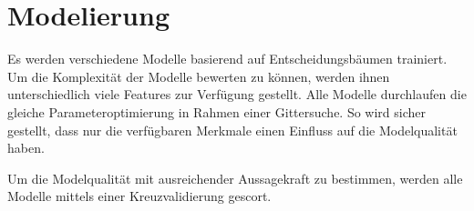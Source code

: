 \chapter{Modelierung}
\label{ch:modelierung}

Es werden verschiedene Modelle basierend auf Entscheidungsbäumen trainiert. Um die Komplexität der Modelle bewerten zu können, werden ihnen unterschiedlich viele Features zur Verfügung gestellt. Alle Modelle durchlaufen die gleiche Parameteroptimierung in Rahmen einer Gittersuche. So wird sicher gestellt, dass nur die verfügbaren Merkmale einen Einfluss auf die Modelqualität haben. 

Um die Modelqualität mit ausreichender Aussagekraft zu bestimmen, werden alle Modelle mittels einer Kreuzvalidierung gescort. 


